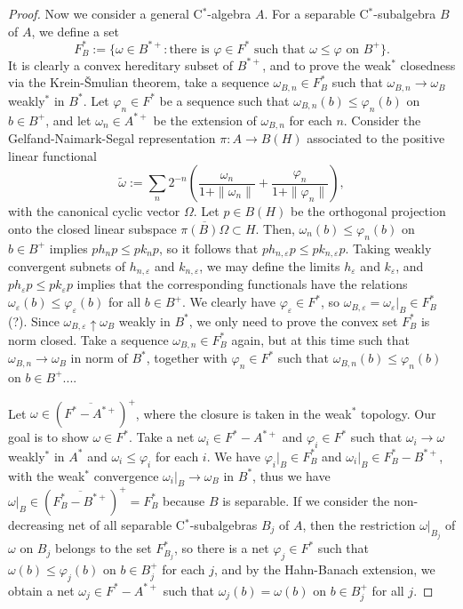\documentclass[a4paper]{amsart}
\newcommand{\e}{\varepsilon}
\theoremstyle{plain}
\theoremstyle{definition}
\begin{document}
\begin{proof}
Now we consider a general C$^*$-algebra $A$.
For a separable C$^*$-subalgebra $B$ of $A$, we define a set
\[F_B^*:=\{\omega\in B^{*+}:\text{there is $\varphi\in F^*$ such that $\omega\le\varphi$ on $B^+$}\}.\]
It is clearly a convex hereditary subset of $B^{*+}$, and to prove the weak$^*$ closedness via the Krein-\v Smulian theorem, take a sequence $\omega_{B,n}\in F_B^*$ such that $\omega_{B,n}\to\omega_B$ weakly$^*$ in $B^*$.
Let $\varphi_n\in F^*$ be a sequence such that $\omega_{B,n}(b)\le\varphi_n(b)$ on $b\in B^+$, and let $\omega_n\in A^{*+}$ be the extension of $\omega_{B,n}$ for each $n$.
Consider the Gelfand-Naimark-Segal representation $\pi:A\to B(H)$ associated to the positive linear functional
\[\widetilde\omega:=\sum_n2^{-n}\left(\frac{\omega_n}{1+\|\omega_n\|}+\frac{\varphi_n}{1+\|\varphi_n\|}\right),\]
with the canonical cyclic vector $\Omega$.
Let $p\in B(H)$ be the orthogonal projection onto the closed linear subspace $\overline{\pi(B)\Omega}\subset H$.
Then, $\omega_n(b)\le\varphi_n(b)$ on $b\in B^+$ implies $ph_np\le pk_np$, so it follows that $ph_{n,\e}p\le pk_{n,\e}p$. 
Taking weakly convergent subnets of $h_{n,\e}$ and $k_{n,\e}$, we may define the limits $h_\e$ and $k_\e$, and $ph_\e p\le pk_\e p$ implies that the corresponding functionals have the relations $\omega_\e(b)\le\varphi_\e(b)$ for all $b\in B^+$.
We clearly have $\varphi_\e\in F^*$, so $\omega_{B,\e}=\omega_\e|_B\in F_B^*$(?).
Since $\omega_{B,\e}\uparrow\omega_B$ weakly in $B^*$, we only need to prove the convex set $F_B^*$ is norm closed.
Take a sequence $\omega_{B,n}\in F_B^*$ again, but at this time such that $\omega_{B,n}\to\omega_B$ in norm of $B^*$, together with $\varphi_n\in F^*$ such that $\omega_{B,n}(b)\le\varphi_n(b)$ on $b\in B^+$....


Let $\omega\in(\overline{F^*-A^{*+}})^+$, where the closure is taken in the weak$^*$ topology.
Our goal is to show $\omega\in F^*$.
Take a net $\omega_i\in F^*-A^{*+}$ and $\varphi_i\in F^*$ such that $\omega_i\to\omega$ weakly$^*$ in $A^*$ and $\omega_i\le\varphi_i$ for each $i$.
We have $\varphi_i|_B\in F^*_{B}$ and $\omega_i|_B\in F^*_B-B^{*+}$, with the weak$^*$ convergence $\omega_i|_B\to\omega_B$ in $B^*$, thus we have $\omega|_B\in(\overline{F_B^*-B^{*+}})^+=F_B^*$ because $B$ is separable.
If we consider the non-decreasing net of all separable C$^*$-subalgebras $B_j$ of $A$, then the restriction $\omega|_{B_j}$ of $\omega$ on $B_j$ belongs to the set $F_{B_j}^*$, so there is a net $\varphi_j\in F^*$ such that $\omega(b)\le\varphi_j(b)$ on $b\in B_j^+$ for each $j$, and by the Hahn-Banach extension, we obtain a net $\omega_j\in F^*-A^{*+}$ such that $\omega_j(b)=\omega(b)$ on $b\in B_j^+$ for all $j$.


\end{proof}
\end{document}
